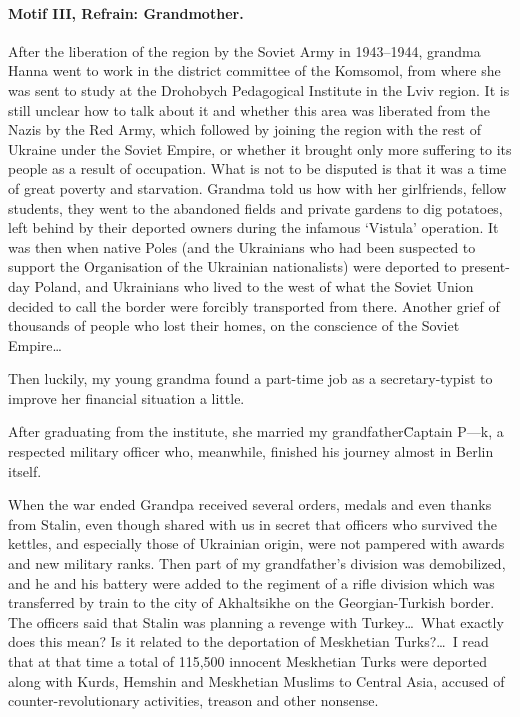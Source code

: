 \paragraph{Motif III, Refrain: Grandmother.}\strut

After the liberation of the region by the Soviet Army in 1943--1944,
grandma Hanna went to work in the district committee of the Komsomol,
from where she was sent to study at the Drohobych Pedagogical
Institute in the Lviv region. It is still unclear how to talk about it
and whether this area was liberated from the Nazis by the Red Army,
which followed by joining the region with the rest of Ukraine under
the Soviet Empire, or whether it brought only more suffering to its
people as a result of occupation. What is not to be disputed is that
it was a time of great poverty and starvation. Grandma told us how
with her girlfriends, fellow students, they went to the abandoned
fields and private gardens to dig potatoes, left behind by their
deported owners during the infamous `Vistula' operation. It was then
when native Poles (and the Ukrainians who had been suspected to
support the Organisation of the Ukrainian nationalists) were deported
to present-day Poland, and Ukrainians who lived to the west of what
the Soviet Union decided to call the border were forcibly transported
from there. Another grief of thousands of people who lost their homes,
on the conscience of the Soviet Empire\ldots\

Then luckily, my young grandma found a part-time
job as a secretary-typist to improve her financial situation a little.

After graduating from the institute, she married my
grandfather\=Captain P---k, a respected military officer who,
meanwhile, finished his journey almost in Berlin itself.

When the war ended Grandpa received several orders, medals and even
thanks from Stalin, even though shared with us in secret that officers
who survived the kettles, %
and especially those of
Ukrainian origin, were not pampered with awards and new military
ranks. Then part of my grandfather's division was demobilized, and he
and his battery were added to the regiment of a rifle division which
was transferred by train to the city of Akhaltsikhe on the
Georgian-Turkish border. The officers said that Stalin was planning a
revenge with Turkey\ldots\ What exactly does this mean? Is it related
to the deportation of Meskhetian Turks?\ldots\ I read that at that time
a total of 115,500 innocent Meskhetian Turks were deported along with
Kurds, Hemshin and Meskhetian Muslims to Central Asia, accused of
counter-revolutionary activities, treason and other nonsense.

